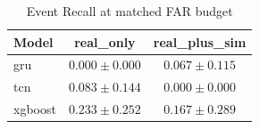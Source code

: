 \begin{table}[htbp]
\centering
\caption{Event Recall at matched FAR budget}
\label{tab:event_recall}
\begin{tabular}{lcc}
\hline
Model & real_only & real_plus_sim \\
\hline
gru & $0.000 \pm 0.000$ & $0.067 \pm 0.115$ \\
tcn & $0.083 \pm 0.144$ & $0.000 \pm 0.000$ \\
xgboost & $0.233 \pm 0.252$ & $0.167 \pm 0.289$ \\
\hline
\end{tabular}
\end{table}